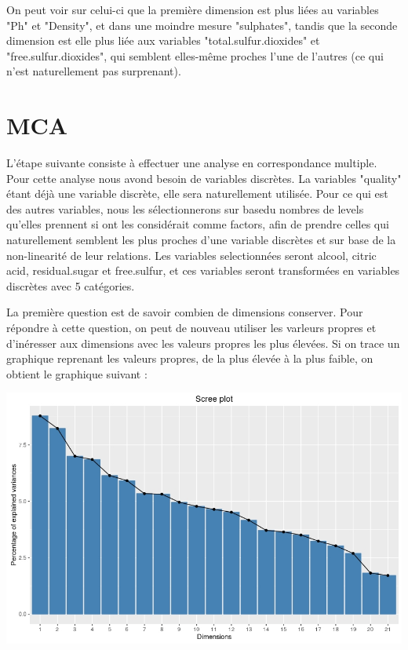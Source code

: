 \documentclass[11pt,a4paper]{article}
\begin{document}
On peut voir sur celui-ci que la première dimension est plus liées au variables "Ph" et "Density", et dans une moindre mesure "sulphates", tandis que la seconde dimension est elle plus liée aux variables "total.sulfur.dioxides" et "free.sulfur.dioxides", qui semblent elles-même proches l'une de l'autres (ce qui n'est naturellement pas surprenant).


\section{MCA}

L'étape suivante consiste à effectuer une analyse en correspondance multiple. Pour cette analyse nous avond besoin de variables discrètes. La variables "quality" étant déjà une variable discrète, elle sera naturellement utilisée. Pour ce qui est des autres variables, nous les sélectionnerons sur basedu nombres de levels qu'elles prennent si ont les considérait comme factors, afin de prendre celles qui naturellement semblent les plus proches d'une variable discrètes et sur base de la non-linearité de leur relations. Les variables selectionnées seront alcool, citric acid, residual.sugar et free.sulfur, et ces variables seront transformées en variables discrètes avec 5 catégories.

La première question est de savoir combien de  dimensions conserver. Pour répondre à cette question, on peut de nouveau utiliser les varleurs propres et d'inéresser aux dimensions avec les valeurs propres les plus élevées. Si on trace un graphique reprenant les valeurs propres, de la plus élevée à la plus faible, on obtient le graphique suivant : 

\begin{center}
\includegraphics[scale=0.4]{"mca-eigen"}
\end{center}
\end{document}
